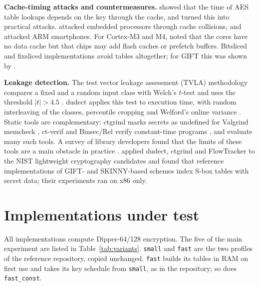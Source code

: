 \documentclass[11pt, a4paper, twoside, reqno]{article}
\newcommand{\tsm}{\texttt{small}}
\newcommand{\tfa}{\texttt{fast}}
\newcommand{\tfc}{\texttt{fast\_const}}
\begin{document}
\textbf{Cache-timing attacks and countermeasures.} \cite{bernstein2005} showed that the time of AES table lookups depends on the key through the cache, and \cite{osvik2006,tromer2010} turned this into practical attacks. \cite{bogdanov2010} attacked embedded processors through cache collisions, and \cite{lipp2016} attacked ARM smartphones. For Cortex-M3 and M4, \cite{schwabe2016} noted that the cores have no data cache but that chips may add flash caches or prefetch buffers. Bitsliced and fixsliced implementations avoid tables altogether; for GIFT this was shown by \cite{adomnicai2020}.

\textbf{Leakage detection.} The test vector leakage assessment (TVLA) methodology compares a fixed and a random input class with Welch's $t$-test and uses the threshold $|t|>4.5$ \citep{goodwill2011,schneider2015}. dudect applies this test to execution time, with random interleaving of the classes, percentile cropping and Welford's online variance \citep{reparaz2017,welford1962}. Static tools are complementary: ctgrind marks secrets as undefined for Valgrind memcheck \citep{langley2010}, ct-verif and Binsec/Rel verify constant-time programs \citep{almeida2016,daniel2020}, and \cite{geimer2023} evaluate many such tools. A survey of library developers found that the limits of these tools are a main obstacle in practice \citep{jancar2022}. \cite{hansen2020} applied dudect, ctgrind and FlowTracker to the NIST lightweight cryptography candidates and found that reference implementations of GIFT- and SKINNY-based schemes index S-box tables with secret data; their experiments ran on x86 only.

\section{Implementations under test}

All implementations compute Dipper-64/128 encryption. The five of the main experiment are listed in Table~\ref{tab:variants}. \tsm{} and \tfa{} are the two profiles of the reference repository, copied unchanged. \tfa{} builds its tables in RAM on first use and takes its key schedule from \tsm{}, as in the repository; so does \tfc{}.
\end{document}
